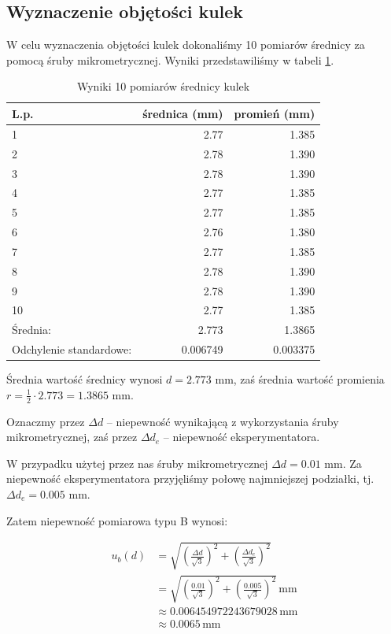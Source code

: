 \documentclass[a4paper]{article}
\begin{document}
\subsection{Wyznaczenie objętości kulek}

W celu wyznaczenia objętości kulek dokonaliśmy 10 pomiarów średnicy za pomocą śruby mikrometrycznej.
Wyniki przedstawiliśmy w tabeli \ref{kulki_srednica}.

\begin{table}[h!]
	\centering
	\begin{tabular}{lrr}
		\toprule
		L.p. &  średnica (mm) &  promień (mm) \\
		\midrule
		1 &           2.77 &         1.385 \\
		2 &           2.78 &         1.390 \\
		3 &           2.78 &         1.390 \\
		4 &           2.77 &         1.385 \\
		5 &           2.77 &         1.385 \\
		6 &           2.76 &         1.380 \\
		7 &           2.77 &         1.385 \\
		8 &           2.78 &         1.390 \\
		9 &           2.78 &         1.390 \\
		10 &           2.77 &         1.385 \\
		\midrule
		Średnia: & 2.773 & 1.3865 \\
		Odchylenie standardowe: & 0.006749 & 0.003375 \\
		\bottomrule
	\end{tabular}
	\caption{Wyniki 10 pomiarów średnicy kulek}
	\label{kulki_srednica}
\end{table}

Średnia wartość średnicy wynosi $d = 2.773$ mm, zaś średnia wartość promienia $r = \frac 1 2 \cdot 2.773 = 1.3865$ mm.

Oznaczmy przez $\Delta d$ -- niepewność wynikającą z wykorzystania śruby mikrometrycznej,
zaś przez $\Delta d_e$ -- niepewność eksperymentatora.

W przypadku użytej przez nas śruby mikrometrycznej $\Delta d = 0.01$ mm.
Za niepewność eksperymentatora przyjęliśmy połowę najmniejszej podziałki, tj. $\Delta d_e = 0.005$ mm.

Zatem niepewność pomiarowa typu B wynosi:

\begin{align*}
	u_b(d) &= \sqrt{\left(\frac{\Delta d}{\sqrt 3}\right)^2 + \left(\frac{\Delta d_e}{\sqrt 3}\right)^2} \\
	&= \sqrt{\left(\frac{0.01}{\sqrt 3}\right)^2 + \left(\frac{0.005}{\sqrt 3}\right)^2} \, \text{mm} \\
	&\approx 0.006454972243679028 \, \text{mm} \\
	&\approx 0.0065 \, \text{mm}
\end{align*}
\end{document}
